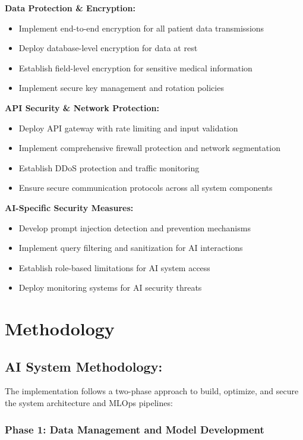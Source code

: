 \documentclass[a4paper, 12pt]{article}
\begin{document}
\textbf{Data Protection \& Encryption:}
\begin{itemize}
    \item Implement end-to-end encryption for all patient data transmissions
    \item Deploy database-level encryption for data at rest
    \item Establish field-level encryption for sensitive medical information
    \item Implement secure key management and rotation policies
\end{itemize}

\textbf{API Security \& Network Protection:}
\begin{itemize}
    \item Deploy API gateway with rate limiting and input validation
    \item Implement comprehensive firewall protection and network segmentation
    \item Establish DDoS protection and traffic monitoring
    \item Ensure secure communication protocols across all system components
\end{itemize}

\textbf{AI-Specific Security Measures:}
\begin{itemize}
    \item Develop prompt injection detection and prevention mechanisms
    \item Implement query filtering and sanitization for AI interactions
    \item Establish role-based limitations for AI system access
    \item Deploy monitoring systems for AI security threats
\end{itemize}

\section{Methodology}

\subsection{AI System Methodology:}
The implementation follows a two-phase approach to build, optimize, and secure the system architecture and MLOps pipelines:

\subsubsection*{Phase 1: Data Management and Model Development}
\end{document}

